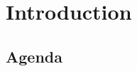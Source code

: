 
\begin{frame}[t,plain]
    \titlepage
\end{frame}

\section{Introduction}
\subsection*{Agenda}
\begin{frame}
    \tableofcontents
    
\end{frame}

